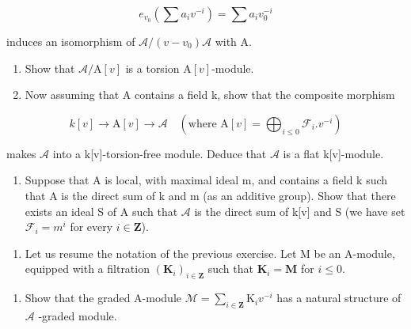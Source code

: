 \[
e _ {v _ {0}} (\sum a _ {i} v ^ {- i}) = \sum a _ {i} v _ {0} ^ {- i}
\]

induces an isomorphism of \(\mathcal{A}/(v - v_{0})\mathcal{A}\) with A.

\begin{enumerate}
\def\labelenumi{\alph{enumi})}
\setcounter{enumi}{2}
\item
  Show that \(\mathcal{A}/\mathrm{A}[v]\) is a torsion \(\mathrm{A}[v]\)-module.
\item
  Now assuming that A contains a field k, show that the composite morphism
\end{enumerate}

\[
k [ v ] \rightarrow \mathrm{A} [ v ] \rightarrow \mathcal {A} \quad (\text {where } \mathrm{A} [ v ] = \bigoplus_ {i \leqslant 0} \mathcal {F} _ {i}. v ^ {- i})
\]

makes \(\mathcal{A}\) into a k{[}v{]}-torsion-free module. Deduce that \(\mathcal{A}\) is a flat k{[}v{]}-module.

\begin{enumerate}
\def\labelenumi{\alph{enumi})}
\setcounter{enumi}{4}
\tightlist
\item
  Suppose that A is local, with maximal ideal m, and contains a field k such that A is the direct sum of k and m (as an additive group). Show that there exists an ideal S of A such that \(\mathcal{A}\) is the direct sum of k{[}v{]} and S (we have set \(\mathcal{F}_{i} = m^{i}\) for every \(i \in \mathbf{Z}\)).
\end{enumerate}

\begin{enumerate}
\def\labelenumi{\arabic{enumi})}
\setcounter{enumi}{2}
\tightlist
\item
  Let us resume the notation of the previous exercise. Let M be an A-module, equipped with a filtration \((\mathbf{K}_i)_{i\in\mathbf{Z}}\) such that \(\mathbf{K}_i = \mathbf{M}\) for \(i \leqslant 0\).
\end{enumerate}

\begin{enumerate}
\def\labelenumi{\alph{enumi})}
\tightlist
\item
  Show that the graded A-module \(\mathcal{M} = \sum_{i\in \mathbf{Z}}\mathrm{K}_{i}v^{-i}\) has a natural structure of \(\mathcal{A}\) -graded module.
\end{enumerate}




